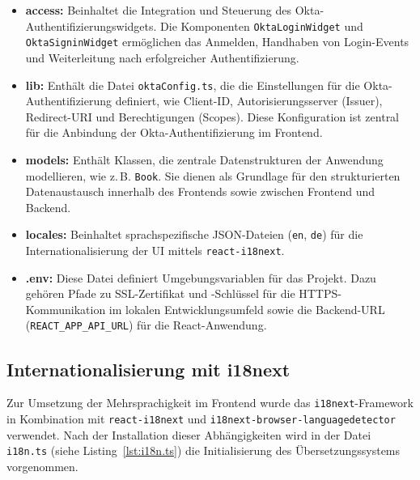 \begin{itemize}
	\item \textbf{access:}  
	Beinhaltet die Integration und Steuerung des Okta-Authentifizierungswidgets.  
	Die Komponenten \texttt{OktaLoginWidget} und \texttt{OktaSigninWidget} ermöglichen das Anmelden, Handhaben von Login-Events und Weiterleitung nach erfolgreicher Authentifizierung.  	
	
	\item \textbf{lib:}  
	Enthält die Datei \texttt{oktaConfig.ts}, die die Einstellungen für die Okta-Authentifizierung definiert, wie Client-ID, Autorisierungsserver (Issuer), Redirect-URI und Berechtigungen (Scopes).  
	Diese Konfiguration ist zentral für die Anbindung der Okta-Authentifizierung im Frontend.
	
	\item \textbf{models:}  
	Enthält Klassen, die zentrale Datenstrukturen der Anwendung modellieren, wie z.\,B. \texttt{Book}.  
	Sie dienen als Grundlage für den strukturierten Datenaustausch innerhalb des Frontends sowie zwischen Frontend und Backend.
	
	\item \textbf{locales:}  
	Beinhaltet sprachspezifische JSON-Dateien (\texttt{en}, \texttt{de}) für die Internationalisierung der UI mittels \texttt{react-i18next}.
	
	\item \textbf{.env:}  
	Diese Datei definiert Umgebungsvariablen für das Projekt.  
	Dazu gehören Pfade zu SSL-Zertifikat und -Schlüssel für die HTTPS-Kommunikation im lokalen Entwicklungsumfeld sowie die Backend-URL (\texttt{REACT\_APP\_API\_URL}) für die React-Anwendung.

\end{itemize}

\subsection{Internationalisierung mit i18next}

Zur Umsetzung der Mehrsprachigkeit im Frontend wurde das \texttt{i18next}-Framework in Kombination mit \texttt{react-i18next} und \texttt{i18next-browser-languagedetector} verwendet. Nach der Installation dieser Abhängigkeiten wird in der Datei \texttt{i18n.ts} (siehe Listing~\ref{lst:i18n.ts}) die Initialisierung des Übersetzungssystems vorgenommen.


